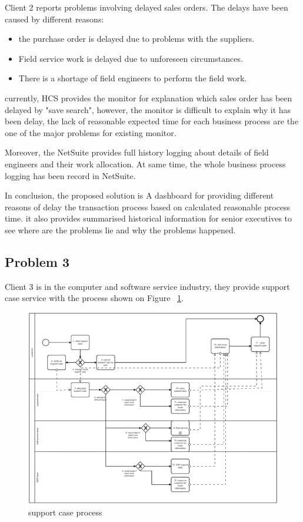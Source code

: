 Client 2  reports problems involving delayed sales orders. The delays have been caused by different reasons:
\begin{itemize}
\item the purchase order is delayed due to problems with the suppliers.
\item Field service work is delayed due to unforeseen circumstances.
\item There is a shortage of field engineers to perform the field work.
\end{itemize}

currently, HCS provides the monitor for explanation which sales order has been delayed by "save search", however, the monitor is difficult to explain why it has been delay, the lack of reasonable expected time for each business process are the one of the major problems for existing monitor. 

Moreover, the NetSuite provides full history logging about details of field engineers and their work allocation. At same time, the whole business process logging has been record in NetSuite.

In conclusion, the proposed solution is A dashboard for providing different reasons of delay the transaction process based on calculated reasonable process time. it also provides summarised historical information for senior executives to see where are the problems lie and why the problems happened. 

\subsection{Problem 3}

Client 3 is in the computer and software service industry, they provide support case service with the process shown on Figure ~\ref{figure:supportCase}.
\begin{figure}[!htb]
    \centering 
    \includegraphics[scale=0.7]{resource/supportCase.png}
    \caption{support case process}
    \label{figure:supportCase}
\end{figure}


